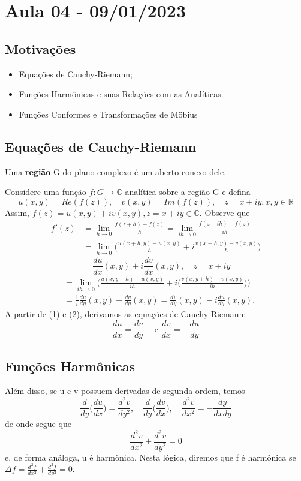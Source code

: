 \documentclass[complex.tex]{subfiles}
\begin{document}
\section{Aula 04 - 09/01/2023}
\subsection{Motivações}
\begin{itemize}
	\item Equações de Cauchy-Riemann;
	\item Funções Harm\^onicas e suas Relações com as Analíticas.
	\item Funções Conformes e Transformações de M\"{o}bius
\end{itemize}
\subsection{Equações de Cauchy-Riemann}
\begin{def*}
	Uma \textbf{região} G do plano complexo é um aberto conexo dele.
\end{def*}
Considere uma função $f:G\rightarrow \mathbb{C}$ analítica sobre a região G e defina
$$
	u(x, y) = Re(f(z)), \quad v(x, y) = Im(f(z)), \quad z=x+iy, x, y\in \mathbb{R}
$$
Assim, $f(z) = u(x, y) + iv(x, y), z=x+iy\in \mathbb{C}.$ Observe que
\begin{align*}
	f'(z) & = \lim _{h\to{0}}\frac{f(z+h) - f(z)}{h} = \lim _{ih\to{0}}\frac{f(z+ih) - f(z)}{ih}            \\
	      & = \lim _{h\to{0}}\biggl(\frac{u(x+h, y) - u(x, y)}{h} + i\frac{v(x + h, y) - v(x, y)}{h}\biggr)
\end{align*}
\begin{equation}
	= \frac{du}{dx}(x, y) + i \frac{dv}{dx}(x, y), \quad z = x + iy
\end{equation}
\begin{align}
	 & = \lim _{ih\to{0}}\biggl(\frac{u(x, y+h) - u(x, y)}{ih} + i\biggl(\frac{v(x, y+h) - v(x, y)}{ih}\biggr)\biggr) \nonumber \\
	 & = \frac{1}{i}\frac{du}{dy}(x, y) + \frac{dv}{dy}(x, y) = \frac{dv}{dy}(x, y) - i \frac{du}{dy}(x, y).
\end{align}
A partir de (1) e (2), derivamos as equações de Cauchy-Riemann:
$$
	\boxed{\frac{du}{dx}=\frac{dv}{dy} \quad \text{ e } \frac{dv}{dx} = -\frac{du}{dy}}
$$
\subsection{Funções Harm\^onicas}
Além disso, se u e v possuem derivadas de segunda ordem, temos
$$
	\frac{d}{dy}\biggl(\frac{du}{dx}\biggr) = \frac{d^2v}{dy^2}, \quad \frac{d}{dy}\biggl(\frac{dv}{dx}\biggr), \quad \frac{d^2v}{dx^2} = -\frac{dy}{dxdy}
$$
de onde segue que
$$
	\frac{d^2v}{dx^2} + \frac{d^2v}{dy^2} = 0
$$
e, de forma análoga, u é harm\^onica. Nesta lógica, diremos que f é harm\^onica
se $\Delta f = \frac{d^2f}{dx^2} + \frac{d^2f}{dy^2} = 0.$
\end{document}
